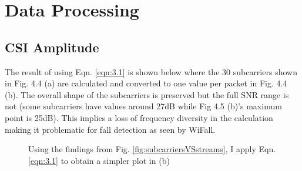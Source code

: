 \section{Data Processing}
\subsection{CSI Amplitude}
The result of using Eqn. \ref{eqn:3.1} is shown below where the 30 subcarriers shown in Fig. 4.4 (a) are calculated and converted to one value per packet in Fig. 4.4 (b). The overall shape of the subcarriers is preserved but the full SNR range is not (some subcarriers have values around 27dB while Fig 4.5 (b)'s maximum point is 25dB). This implies a loss of frequency diversity in the calculation making it problematic for fall detection as seen by WiFall.
\begin{figure}[H]%
    \centering
    \qquad
    \caption{Using the findings from Fig. \ref{fig:subcarriersVSstreams}, I apply Eqn. \ref{eqn:3.1} to obtain a simpler plot in (b)}%
    \label{fig:applyingAmplitudeEquation}%
\end{figure}
